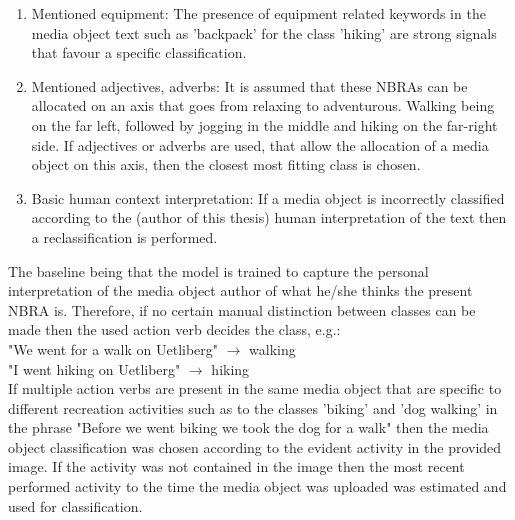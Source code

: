 \begin{enumerate}
    \item Mentioned equipment: The presence of equipment related keywords in the media object text such as 'backpack' for the class 'hiking' are strong signals that favour a specific classification.
    \item Mentioned adjectives, adverbs: It is assumed that these NBRAs can be allocated on an axis that goes from relaxing to adventurous. Walking being on the far left, followed by jogging in the middle and hiking on the far-right side. If adjectives or adverbs are used, that allow the allocation of a media object on this axis, then the closest most fitting class is chosen.
    \item Basic human context interpretation: If a media object is incorrectly classified according to the (author of this thesis) human interpretation of the text then a reclassification is performed.
\end{enumerate}

The baseline being that the model is trained to capture the personal interpretation of the media object author of what he/she thinks the present NBRA is. Therefore, if no certain manual distinction between classes can be made then the used action verb decides the class, e.g.:\\
"We went for a walk on Uetliberg" $\to$ walking \\
"I went hiking on Uetliberg" $\to$ hiking\\
If multiple action verbs are present in the same media object that are specific to different recreation activities such as to the classes 'biking' and 'dog walking' in the phrase "Before we went biking we took the dog for a walk" then the media object classification was chosen according to the evident activity in the provided image. If the activity was not contained in the image then the most recent performed activity to the time the media object was uploaded was estimated and used for classification.

